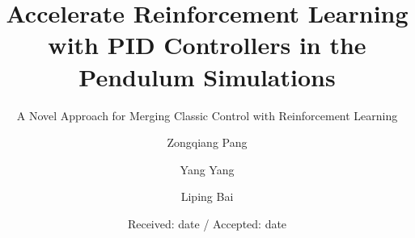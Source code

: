 \documentclass[smallextended]{svjour3}
\begin{document}
\title{Accelerate Reinforcement Learning with PID Controllers in the Pendulum Simulations%
}
\subtitle{A Novel Approach for Merging Classic Control with Reinforcement Learning}


\author{Zongqiang Pang         \and
        Yang Yang \and
        Liping Bai
}



\date{Received: date / Accepted: date}


\maketitle
\end{document}
